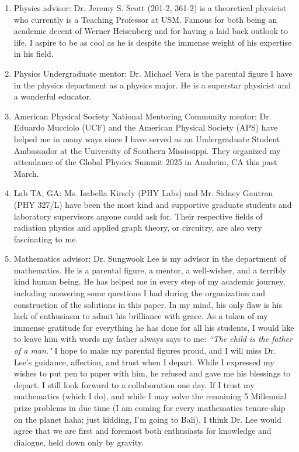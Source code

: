 \documentclass{article}
\begin{document}
\begin{enumerate}
    \item Physics advisor: Dr. Jeremy S. Scott (201-2, 361-2) is a theoretical physicist who currently is a Teaching Professor at USM. Famous for both being an academic decent of Werner Heisenberg and for having a laid back outlook to life, I aspire to be as cool as he is despite the immense weight of his expertise in his field. 
    \item Physics Undergraduate mentor: Dr. Michael Vera is the parental figure I have in the physics department as a physics major. He is a superstar physicist and a wonderful educator. 
    \item American Physical Society National Mentoring Community mentor: Dr. Eduardo Mucciolo (UCF) and the American Physical Society (APS) have helped me in many ways since I have served as an Undergraduate Student Ambassador at the University of Southern Mississippi. They organized my attendance of the Global Physics Summit 2025 in Anaheim, CA this past March. 
    \item Lab TA, GA: Ms. Isabella Kirsely (PHY Labs) and Mr. Sidney Gautrau (PHY 327/L) have been the most kind and supportive graduate students and laboratory supervisors anyone could ask for. Their respective fields of radiation physics and applied graph theory, or circuitry, are also very fascinating to me. 
    \item Mathematics advisor: Dr. Sungwook Lee is my advisor in the department of mathematics. He is a parental figure, a mentor, a well-wisher, and a terribly kind human being. He has helped me in every step of my academic journey, including answering some questions I had during the organization and construction of the solutions in this paper. In my mind, his only flaw is his lack of enthusiasm to admit his brilliance with grace. As a token of my immense gratitude for everything he has done for all his students, I would like to leave him with words my father always says to me: \textit{``The child is the father of a man."} I hope to make my parental figures proud, and I will miss Dr. Lee's guidance, affection, and trust when I depart. While I expressed my wishes to put pen to paper with him, he refused and gave me his blessings to depart. I still look forward to a collaboration one day. If I trust my mathematics (which I do), and while I may solve the remaining 5 Millennial prize problems in due time (I am coming for every mathematics tenure-ship on the planet haha; just kidding, I'm going to Bali), I think Dr. Lee would agree that we are first and foremost both enthusiasts for knowledge and dialogue, held down only by gravity. 

\end{enumerate}
\end{document}
